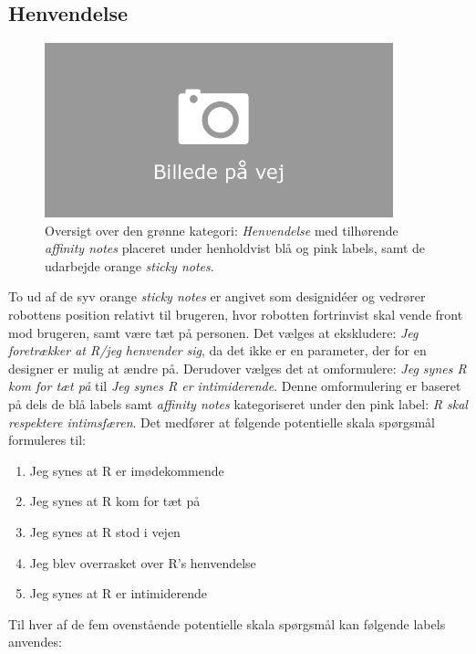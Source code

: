 \subsection{Henvendelse}
\label{ParametreHenvendelse}
%
\begin{figure}[H]
\centering
\includegraphics[width = 0.9\textwidth]{Figure/AffinityDiagram/Henvendelse} 
\caption{Oversigt over den grønne kategori: \textit{Henvendelse} med tilhørende \textit{affinity notes} placeret under henholdvist blå og pink labels, samt de udarbejde orange \textit{sticky notes}.}
\label{fig:AFHenvendelse}
\end{figure}
\noindent
%
To ud af de syv orange \textit{sticky notes} er angivet som designidéer og vedrører robottens position relativt til brugeren, hvor robotten fortrinvist skal vende front mod brugeren, samt være tæt på personen. Det vælges at ekskludere: \textit{Jeg foretrækker at R/jeg henvender sig}, da det ikke er en parameter, der for en designer er mulig at ændre på. Derudover vælges det at omformulere: \textit{Jeg synes R kom for tæt på} til \textit{Jeg synes R er intimiderende}. Denne omformulering er baseret på dels de blå labels samt \textit{affinity notes} kategoriseret under den pink label: \textit{R skal respektere intimsfæren}. Det medfører at følgende potentielle skala spørgsmål formuleres til: \blankline
%
\begin{enumerate}
  \item Jeg synes at R er imødekommende
  \item Jeg synes at R kom for tæt på
  \item Jeg synes at R stod i vejen
  \item Jeg blev overrasket over R's henvendelse 
  \item Jeg synes at R er intimiderende\blankline
\end{enumerate}
%
Til hver af de fem ovenstående potentielle skala spørgsmål kan følgende labels anvendes:
%
